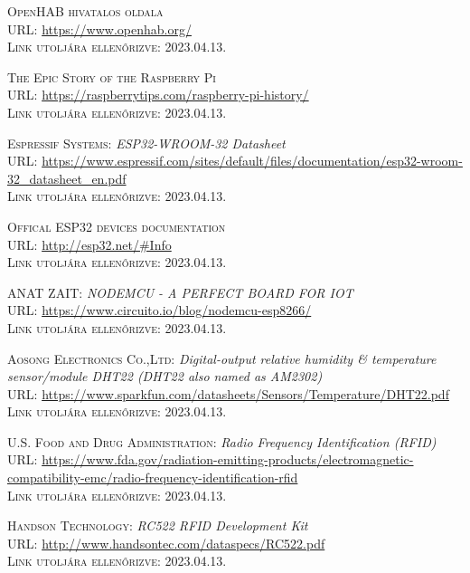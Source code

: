 \documentclass[
]{thesis-ekf}
\theoremstyle{definition}
\theoremstyle{remark}
\begin{document}
\begin{thebibliography}{46}
		\textsc{OpenHAB hivatalos oldala}\\
		\textsc{URL:} \url{https://www.openhab.org/}\\
		\textsc{Link utoljára ellenőrizve:} 2023.04.13.
		
		\textsc{The Epic Story of the Raspberry Pi}\\
		\textsc{URL:} \url{https://raspberrytips.com/raspberry-pi-history/}\\
		\textsc{Link utoljára ellenőrizve:} 2023.04.13.
		
		\textsc{Espressif Systems:} \emph{ESP32­-WROOM-­32 Datasheet}\\
		\textsc{URL:} \url{https://www.espressif.com/sites/default/files/documentation/esp32-wroom-32_datasheet_en.pdf}\\
		\textsc{Link utoljára ellenőrizve:} 2023.04.13.
		
		\textsc{Offical ESP32 devices documentation}\\
		\textsc{URL:} \url{http://esp32.net/#Info}\\
		\textsc{Link utoljára ellenőrizve:} 2023.04.13.
		
		\textsc{ANAT ZAIT:} \emph{NODEMCU - A PERFECT BOARD FOR IOT}\\
		\textsc{URL:} \url{https://www.circuito.io/blog/nodemcu-esp8266/}\\
		\textsc{Link utoljára ellenőrizve:} 2023.04.13.
		
		\textsc{Aosong Electronics Co.,Ltd:} \emph{Digital-output relative humidity \& temperature sensor/module DHT22 (DHT22 also named as AM2302)}\\
		\textsc{URL:} \url{https://www.sparkfun.com/datasheets/Sensors/Temperature/DHT22.pdf}\\
		\textsc{Link utoljára ellenőrizve:} 2023.04.13.
		
		\textsc{U.S. Food and Drug Administration:} \emph{Radio Frequency Identification (RFID)}\\
		\textsc{URL:} \url{https://www.fda.gov/radiation-emitting-products/electromagnetic-compatibility-emc/radio-frequency-identification-rfid}\\
		\textsc{Link utoljára ellenőrizve:} 2023.04.13.
		
		\textsc{Handson Technology:} \emph{RC522 RFID Development Kit}\\
		\textsc{URL:} \url{http://www.handsontec.com/dataspecs/RC522.pdf}\\
		\textsc{Link utoljára ellenőrizve:} 2023.04.13.
		

\end{thebibliography}
\end{document}
